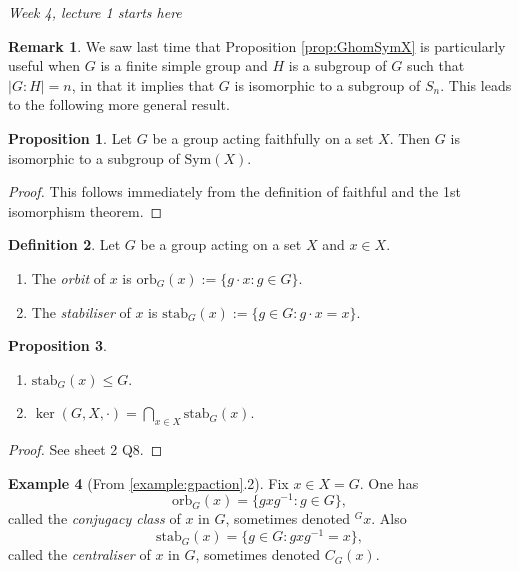 \documentclass[a4paper]{article}
\newcommand{\orb}{\text{orb}}
\newcommand{\stab}{\text{stab}}
\newcommand{\Sym}{\text{Sym}}
\theoremstyle{definition}
\newtheorem{defn}{Definition}[subsection]
\newtheorem{prop}[defn]{Proposition}
\newtheorem{example}[defn]{Example}
\newtheorem*{remark}{Remark}
\begin{document}
\begin{flushright}
\textit{Week 4, lecture 1 starts here}
\end{flushright}

\begin{remark}
We saw last time that Proposition \ref{prop:GhomSymX} is particularly useful when $G$ is a finite simple group and $H$ is a subgroup of $G$ such that $|G:H|=n$, in that it implies that $G$ is isomorphic to a subgroup of $S_n$. This leads to the following more general result.
\end{remark}

\begin{prop}
\label{prop:faithfulisosgpsymX}
Let $G$ be a group acting faithfully on a set $X$. Then $G$ is isomorphic to a subgroup of $\Sym(X)$.
\end{prop}
\begin{proof}
This follows immediately from the definition of faithful and the 1st isomorphism theorem.
\end{proof}

\begin{defn}
Let $G$ be a group acting on a set $X$ and $x\in X$.
\begin{enumerate}
\item The \textit{orbit} of $x$ is $\orb_G(x):=\{g\cdot x:g\in G\}$.
\item The \textit{stabiliser} of $x$ is $\stab_G(x):=\{g\in G:g\cdot x=x\}$.
\end{enumerate}
\end{defn}

\begin{prop}
\begin{enumerate}
\item $\stab_G(x)\leq G$.
\item $\displaystyle \ker (G,X,\cdot)=\bigcap_{x\in X} \stab_G(x)$.
\end{enumerate}
\end{prop}
\begin{proof}
See sheet 2 Q8.
\end{proof}

\begin{example}[From \ref{example:gpaction}.2]
Fix $x\in X=G$. One has
\[
\orb_G(x)=\{gxg^{-1}:g\in G\},
\]
called the \textit{conjugacy class} of $x$ in $G$, sometimes denoted $^G x$. Also
\[
\stab_G(x)=\{g\in G:gxg^{-1}=x\},
\]
called the \textit{centraliser} of $x$ in $G$, sometimes denoted $C_G(x)$.
\end{example}
\end{document}
